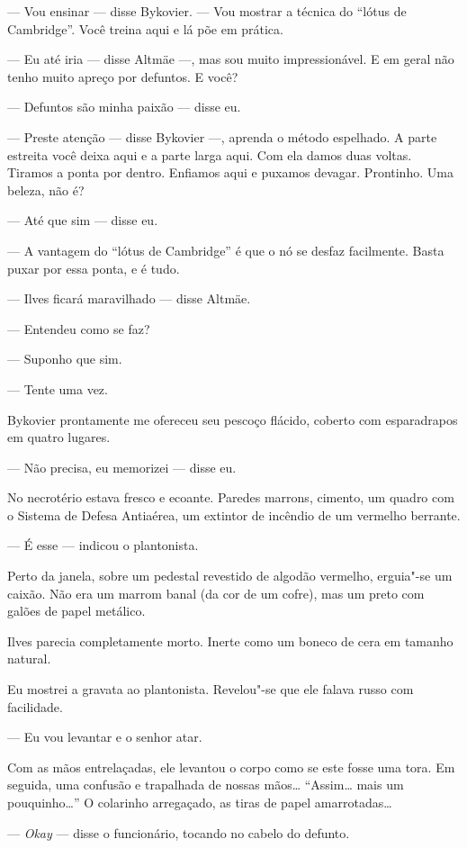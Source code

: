 --- Vou ensinar --- disse Bykovier. --- Vou mostrar a técnica do ``lótus
de Cambridge''. Você treina aqui e lá põe em prática.

--- Eu até iria --- disse Altmäe ---, mas sou muito impressionável. E em
geral não tenho muito apreço por defuntos. E você?

--- Defuntos são minha paixão --- disse eu.

--- Preste atenção --- disse Bykovier ---, aprenda o método espelhado. A
parte estreita você deixa aqui e a parte larga aqui. Com ela damos duas
voltas. Tiramos a ponta por dentro. Enfiamos aqui e puxamos devagar.
Prontinho. Uma beleza, não é?

--- Até que sim --- disse eu.

--- A vantagem do ``lótus de Cambridge'' é que o nó se desfaz facilmente.
Basta puxar por essa ponta, e é tudo.

--- Ilves ficará maravilhado --- disse Altmäe.

--- Entendeu como se faz?

--- Suponho que sim.

--- Tente uma vez.

Bykovier prontamente me ofereceu seu pescoço flácido, coberto com
esparadrapos em quatro lugares.

--- Não precisa, eu memorizei --- disse eu.

No necrotério estava fresco e ecoante. Paredes marrons, cimento, um
quadro com o Sistema de Defesa Antiaérea, um extintor de incêndio de um
vermelho berrante.

--- É esse --- indicou o plantonista.

Perto da janela, sobre um pedestal revestido de algodão vermelho,
erguia"-se um caixão. Não era um marrom banal (da cor de um cofre), mas
um preto com galões de papel metálico.

Ilves parecia completamente morto. Inerte como um boneco de cera em
tamanho natural.

Eu mostrei a gravata ao plantonista. Revelou"-se que ele falava russo com
facilidade.

--- Eu vou levantar e o senhor atar.

Com as mãos entrelaçadas, ele levantou o corpo como se este fosse uma
tora. Em seguida, uma confusão e trapalhada de nossas mãos\ldots{}
``Assim\ldots{} mais um pouquinho\ldots{}'' O colarinho arregaçado, as tiras de
papel amarrotadas\ldots{}

--- \emph{Okay} --- disse o funcionário, tocando no cabelo do
defunto.


